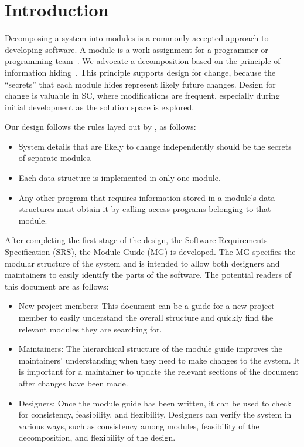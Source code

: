 \documentclass[12pt, titlepage]{article}
\begin{document}
\newpage

\tableofcontents

\listoftables

\listoffigures

\newpage


\section{Introduction}

Decomposing a system into modules is a commonly accepted approach to developing
software.  A module is a work assignment for a programmer or programming
team~\citep{ParnasEtAl1984}.  We advocate a decomposition
based on the principle of information hiding~\citep{Parnas1972a}.  This
principle supports design for change, because the ``secrets'' that each module
hides represent likely future changes.  Design for change is valuable in SC,
where modifications are frequent, especially during initial development as the
solution space is explored.  

Our design follows the rules layed out by \citet{ParnasEtAl1984}, as follows:
\begin{itemize}
\item System details that are likely to change independently should be the
  secrets of separate modules.
\item Each data structure is implemented in only one module.
\item Any other program that requires information stored in a module's data
  structures must obtain it by calling access programs belonging to that module.
\end{itemize}

After completing the first stage of the design, the Software Requirements
Specification (SRS), the Module Guide (MG) is developed. The MG
specifies the modular structure of the system and is intended to allow both
designers and maintainers to easily identify the parts of the software.  The
potential readers of this document are as follows:

\begin{itemize}
\item New project members: This document can be a guide for a new project member
  to easily understand the overall structure and quickly find the
  relevant modules they are searching for.
\item Maintainers: The hierarchical structure of the module guide improves the
  maintainers' understanding when they need to make changes to the system. It is
  important for a maintainer to update the relevant sections of the document
  after changes have been made.
\item Designers: Once the module guide has been written, it can be used to
  check for consistency, feasibility, and flexibility. Designers can verify the
  system in various ways, such as consistency among modules, feasibility of the
  decomposition, and flexibility of the design.
\end{itemize}
\end{document}
